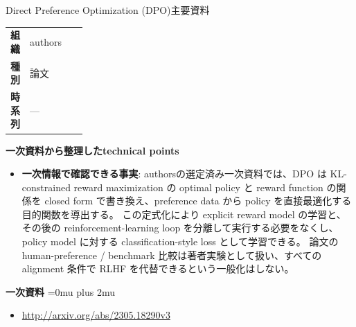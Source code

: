 \begin{technicalnote}{Direct Preference Optimization (DPO)}{主要資料}
\begingroup
\begin{tabularx}{\linewidth}{@{}>{\bfseries}p{0.22\linewidth}X@{}}
組織 & authors \\
種別 & 論文 \\
時系列 & — \\
\end{tabularx}
\smallskip
{\bfseries 一次資料から整理したtechnical points}
\begin{itemize}[leftmargin=1.5em,itemsep=0.35em]
\item \textbf{一次情報で確認できる事実}: authorsの選定済み一次資料では、DPO は KL-constrained reward maximization の optimal policy と reward function の関係を closed form で書き換え、preference data から policy を直接最適化する目的関数を導出する。 この定式化により explicit reward model の学習と、その後の reinforcement-learning loop を分離して実行する必要をなくし、policy model に対する classification-style loss として学習できる。 論文の human-preference / benchmark 比較は著者実験として扱い、すべての alignment 条件で RLHF を代替できるという一般化はしない。
\end{itemize}
\begin{minipage}{\linewidth}
\begin{samepage}
{\bfseries 一次資料}
\begingroup\sloppy
\Urlmuskip=0mu plus 2mu\relax
\begin{itemize}[leftmargin=1.5em,itemsep=0.25em]
\item {\scriptsize\url{http://arxiv.org/abs/2305.18290v3}}
\end{itemize}
\endgroup
\end{samepage}
\end{minipage}
\endgroup
\end{technicalnote}
\medskip

